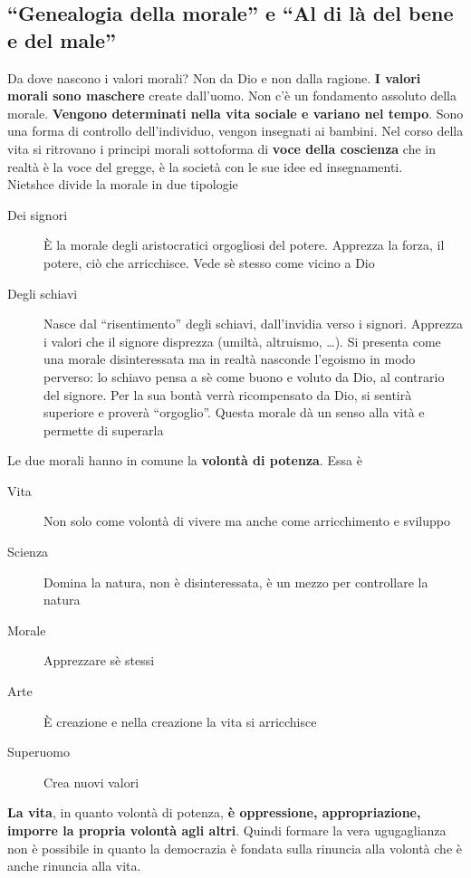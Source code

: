 \subsection{``Genealogia della morale'' e ``Al di là del bene e del male''}
Da dove nascono i valori morali? Non da Dio e non dalla ragione. \textbf{I valori morali sono
  maschere} create dall'uomo. Non c'è un fondamento assoluto della morale. \textbf{Vengono determinati
nella vita sociale e variano nel tempo}. Sono una forma di controllo dell'individuo, vengon insegnati
ai bambini. Nel corso della vita si ritrovano i principi morali sottoforma di \textbf{voce della
coscienza} che in realtà è la voce del gregge, è la società con le sue idee ed insegnamenti.\\
Nietshce divide la morale in due tipologie
\begin{description}
  \item[Dei signori] È la morale degli aristocratici orgogliosi del potere. Apprezza la forza, il
    potere, ciò che arricchisce. Vede sè stesso come vicino a Dio
  \item[Degli schiavi] Nasce dal ``risentimento'' degli schiavi, dall'invidia verso i signori. 
    Apprezza i valori che il signore disprezza (umiltà, altruismo, \ldots). Si presenta come una
    morale disinteressata ma in realtà nasconde l'egoismo in modo perverso: lo schiavo pensa a sè
    come buono e voluto da Dio, al contrario del signore. Per la sua bontà verrà ricompensato da Dio,
    si sentirà superiore e proverà ``orgoglio''. Questa morale dà un senso alla vità e permette di
    superarla
\end{description}
Le due morali hanno in comune la \textbf{volontà di potenza}. Essa è
\begin{description}
  \item[Vita] Non solo come volontà di vivere ma anche come arricchimento e sviluppo
  \item[Scienza] Domina la natura, non è disinteressata, è un mezzo per controllare la natura
  \item[Morale] Apprezzare sè stessi
  \item[Arte] È creazione e nella creazione la vita si arricchisce
  \item[Superuomo] Crea nuovi valori
\end{description}
\textbf{La vita}, in quanto volontà di potenza, \textbf{è oppressione, appropriazione, imporre la 
propria volontà agli altri}. Quindi formare la vera ugugaglianza non è possibile in quanto la
democrazia è fondata sulla rinuncia alla volontà che è anche rinuncia alla vita.

